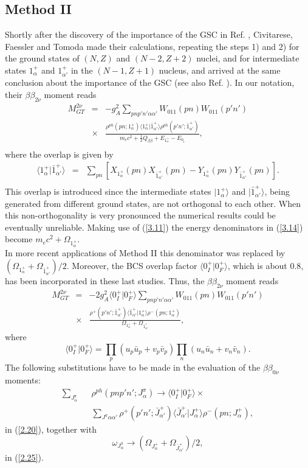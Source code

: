 \documentclass[nofootinbib,twocolumn,eqsecnum,floats,aps]{revtex4}
\def\sss{\scriptscriptstyle}
\def\nn{\nonumber }
\def\x{\times}
\def\nn{\nonumber }
\def\be{\begin{equation}}
\def\ee{\end{equation}}
\def\br{\begin{eqnarray}}
\def\er{\end{eqnarray}}
\def\ket#1{|#1 \rangle}
\def\rf#1{{(\ref{#1})}}
\def\ov#1#2{\langle #1 | #2  \rangle }
\def\go{\rightarrow  }
\def\fot{\frac{1}{2}}
\def\a {{\alpha}}
\def\b {{\beta}}
\def\sss{\scriptscriptstyle}
\begin{document}
\subsection  {Method II}\label{Sec3B}

Shortly after the discovery of the importance of the GSC in
Ref. \cite{Vog86}, Civitarese, Faessler and Tomoda  \cite{Civ87} made their calculations,
 repeating the steps 1) and 2)
for the ground states of $(N,Z)$ and $(N-2,Z+2)$ nuclei, and for
intermediate states $1^+_\a$  and $1^+_{\a'}$ in the $(N-1,Z+1)$ nucleus, and arrived at
 the same conclusion about the importance of the GSC (see also Ref.  \cite{Sta90}).
In our notation, their $\b\b_{2\nu}$ moment reads
\br
M_{ GT}^{2\nu}&=&-g_{\sss A}^2\sum_{pnp'n'\a\a'}W_{011}(pn) W_{011}(p'n')
\nn\\
&\x&\frac{\rho^{ph}(pn;1_\a^+)\ov{1_\a^+}{{\bar 1}_{\a'}^+}\rho^{ph}(p'n';{\bar 1}_{\a'}^+)}
{m_ec^2+\fot Q_{\b\b}+E_{1_\a^+}-E_{0_i}},
\nn\\
\label{3.14}
\end{eqnarray}
where the overlap is given by
\br
\ov{1_\a^+}{{\bar 1}_{\a'}^+}&=&\sum_{pn}\left[X_{1^+_{\a}}(pn)X_{{\bar 1}^+_{\a'}}(pn)-Y_{1^+_{\a}}(pn)Y_{{\bar 1}^+_{\a'}}(pn)\right].
\nn\\
\label{3.15}
\end{eqnarray}
This overlap is introduced since the intermediate
states $\ket{{1_\a^+}}$ and $\ket{{{\bar 1}_{\a'}^+}}$, being generated
from different  ground states,
are not orthogonal to each other. When this non-orthogonality is very
pronounced the numerical results could be eventually unreliable.
Making use of \rf{3.11} the energy denominators in \rf{3.14} become
$m_ec^2+\Omega_{1^+_\a}$.
\\
In more recent applications of
 Method II \cite{Pac04,Sal09,Sar16} this denominator  was replaced by %
$({\Omega_{1^+_\a}+\Omega_{{\bar 1}^+_{\a'}}})/2$. Moreover,
 the BCS overlap factor $\ov{0^+_I}{0^+_F}$, which  is about $0.8$,
has been incorporated in these last studies.
Thus, the $\b\b_{2\nu}$ moment reads
\br
M_{ GT}^{2\nu}&=&-2g_{\sss A}^2\ov{0^+_I}{0^+_F}\sum_{pnp'n'\a\a'}W_{011}(pn) W_{011}(p'n')
\nn\\
&\x&\frac{\rho^{+}(p'n';{\bar 1}_{\a'}^+)\ov{{\bar 1}_{\a'}^+}{1_\a^+}\rho^{-}(pn;1_\a^+)}
{{\Omega_{1^+_\a}+\Omega_{{\bar 1}^+_{\a'}}}},
\label{3.16}
\end{eqnarray}
where
\be
\ov{0^+_I}{0^+_F}=\prod_p(u_p{\bar u}_p+v_p{\bar v}_p)\prod_n(u_n{\bar u}_n+v_n{\bar v}_n).
\label{3.17}
\ee
The following substitutions have to be made
in the evaluation of the $\b\b_{0\nu}$ moments:
\br
\sum_{J_\a^\pi}
&&\rho^{ph}(pnp'n';J_\a^\pi)\go\ov{0^+_I}{0^+_F}\x
\nn\\
&&\sum_{J^\pi \a\a'}\rho^{+}(p'n';{\bar J}_{\a'}^+)\ov{{\bar J}_{\a'}^+}{J_\a^+}\rho^{-}(pn;J_\a^+),
\label{3.18}\er
in  \rf{2.20},
together with
\begin{equation}
{\omega}_{J^\pi_{\a}}\go({{\Omega_{J^+_\a}+\Omega_{{\bar J}^+_{\a'}}}})/2,
\label{3.19}\end{equation}
in  \rf{2.25}.%
\end{document}

